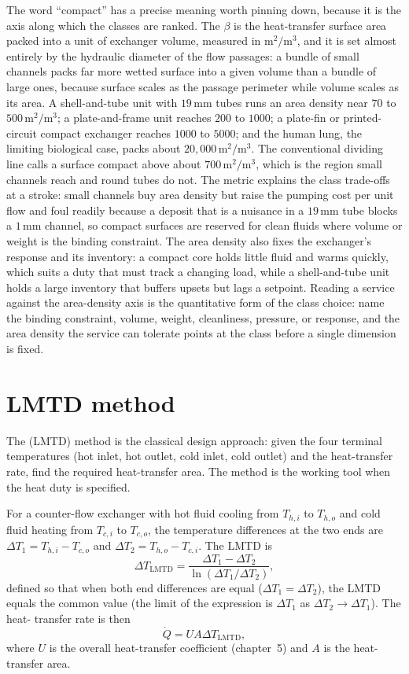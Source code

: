 The word ``compact'' has a precise meaning worth pinning down, because it is the
axis along which the classes are ranked. The  $\beta$ is the
heat-transfer surface area packed into a unit of exchanger volume, measured in
$\text{m}^2/\text{m}^3$, and it is set almost entirely by the hydraulic diameter of
the flow passages: a bundle of small channels packs far more wetted surface into a
given volume than a bundle of large ones, because surface scales as the passage
perimeter while volume scales as its area. A shell-and-tube unit with
$19\,\si{\milli\meter}$ tubes runs an area density near $70$ to $500\,\text{m}^2/
\text{m}^3$; a plate-and-frame unit reaches $200$ to $1000$; a plate-fin or
printed-circuit compact exchanger reaches $1000$ to $5000$; and the human lung, the
limiting biological case, packs about $20{,}000\,\text{m}^2/\text{m}^3$. The
conventional dividing line calls a surface compact above about $700\,\text{m}^2/
\text{m}^3$, which is the region small channels reach and round tubes do not. The
metric explains the class trade-offs at a stroke: small channels buy area density
but raise the pumping cost per unit flow and foul readily because a deposit that is
a nuisance in a $19\,\si{\milli\meter}$ tube blocks a $1\,\si{\milli\meter}$
channel, so compact surfaces are reserved for clean fluids where volume or weight is
the binding constraint. The area density also fixes the exchanger's response and its
inventory: a compact core holds little fluid and warms quickly, which suits a duty
that must track a changing load, while a shell-and-tube unit holds a large inventory
that buffers upsets but lags a setpoint. Reading a service against the area-density
axis is the quantitative form of the class choice: name the binding constraint,
volume, weight, cleanliness, pressure, or response, and the area density the service
can tolerate points at the class before a single dimension is fixed.

\section{LMTD method}

The  (LMTD) method is the
classical design approach: given the four terminal temperatures (hot
inlet, hot outlet, cold inlet, cold outlet) and the heat-transfer
rate, find the required heat-transfer area. The method is the
working tool when the heat duty is specified.

For a counter-flow exchanger with hot fluid cooling from $T_{h,i}$
to $T_{h,o}$ and cold fluid heating from $T_{c,i}$ to $T_{c,o}$, the
temperature differences at the two ends are $\Delta T_1 = T_{h,i} -
T_{c,o}$ and $\Delta T_2 = T_{h,o} - T_{c,i}$. The LMTD is
\[
\Delta T_{\text{LMTD}} = \frac{\Delta T_1 - \Delta T_2}{\ln(\Delta
T_1/\Delta T_2)},
\]
defined so that when both end differences are equal ($\Delta T_1 =
\Delta T_2$), the LMTD equals the common value (the limit of the
expression is $\Delta T_1$ as $\Delta T_2 \to \Delta T_1$). The heat-
transfer rate is then
\[
\dot{Q} = U A \Delta T_{\text{LMTD}},
\]
where $U$ is the overall heat-transfer coefficient (chapter~5) and
$A$ is the heat-transfer area.

